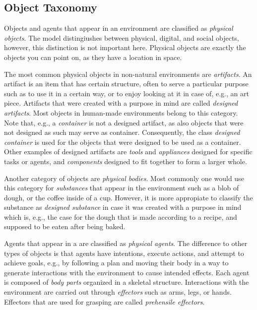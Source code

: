 \subsection{Object Taxonomy}
Objects and agents that appear in an environment are classified as \emph{physical objects}.
The \neem model distingiushes between physical, digital, and social objects, however, this distinction is not important here.
Physical objects are exactly the objects you can point on, as they have a location in space.

The most common physical objects in non-natural environments are \emph{artifacts}.
An artifact is an item that has certain structure, often to serve a particular purpose such as to use it in a certain way, or to enjoy looking at it in case of, e.g., an art piece.
Artifacts that were created with a purpose in mind are called \emph{designed artifacts}.
Most objects in human-made environments belong to this category.
Note that, e.g., a \emph{container} is not a designed artifact, as also objects that were not designed as such may serve as container.
Consequently, the class \emph{designed container} is used for the objects that were designed to be used as a container.
Other examples of designed artifacts are \emph{tools} and \emph{appliances} designed for specific tasks or agents, and \emph{components} designed to fit together to form a larger whole.

Another category of objects are \emph{physical bodies}.
Most commonly one would use this category for \emph{substances} that appear in the environment such as a blob of dough, or the coffee inside of a cup.
However, it is more appropiate to classify the substance as \emph{designed substance} in case it was created with a purpose in mind which is, e.g., the case for the dough that is made according to a recipe, and supposed to be eaten after being baked.

Agents that appear in a \neem are classified as \emph{physical agents}.
The difference to other types of objects is that agents have intentions, execute actions, and attempt to achieve goals, e.g., by following a plan and moving their body in a way to generate interactions with the environment to cause intended effects.
Each agent is composed of \emph{body parts} organized in a skeletal structure. 
Interactions with the environment are carried out through \emph{effectors} such as arms, legs, or hands.
Effectors that are used for grasping are called \emph{prehensile effectors}.


